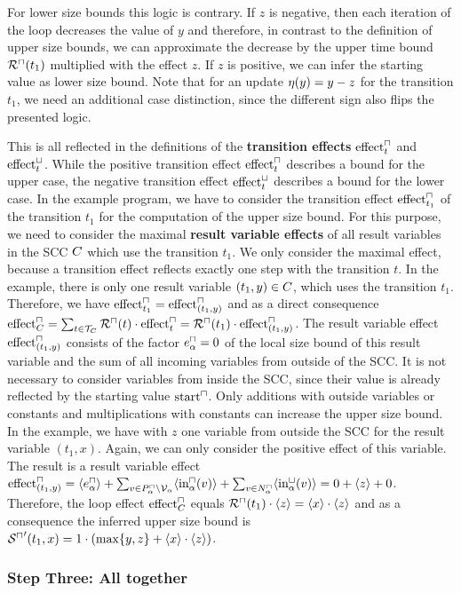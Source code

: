 For lower size bounds this logic is contrary.
If $z$ is negative, then each iteration of the loop decreases the value of $y$ and therefore, in contrast to the definition of upper size bounds, we can approximate the decrease by the upper time bound ${\mathcal{R}^\sqcap}(t_1)$ multiplied with the effect $z$.
If $z$ is positive, we can infer the starting value as lower size bound.
Note that for an update $\eta(y) = y - z$ for the transition $t_1$, we need an additional case distinction, since the different sign also flips the presented logic.

This is all reflected in the definitions of the \textbf{transition effects} $\text{effect}^\sqcap_t$ and $\text{effect}^\sqcup_t$.
While the positive transition effect $\text{effect}^\sqcap_t$ describes a bound for the upper case, the negative transition effect $\text{effect}^\sqcup_t$ describes a bound for the lower case.
In the example program, we have to consider the transition effect $\text{effect}^\sqcap_{t_1}$ of the transition $t_1$ for the computation of the upper size bound.
For this purpose, we need to consider the maximal \textbf{result variable effects} of all result variables in the SCC $C$ which use the transition $t_1$.
We only consider the maximal effect, because a transition effect reflects exactly one step with the transition $t$.
In the example, there is only one result variable $(t_1,y) \in C$, which uses the transition $t_1$.
Therefore, we have $\text{effect}^\sqcap_{t_1} = \text{effect}^\sqcap_{(t_1,y)}$ and as a direct consequence $\text{effect}^\sqcap_C = \sum_{t \in \mathcal{T}_C} {\mathcal{R}^\sqcap}(t) \cdot \text{effect}^\sqcap_{t} = {\mathcal{R}^\sqcap}(t_1) \cdot \text{effect}^\sqcap_{(t_1,y)}$.
The result variable effect $\text{effect}^\sqcap_{(t_1,y)}$ consists of the factor $e^\sqcap_\alpha = 0$ of the local size bound of this result variable and the sum of all incoming variables from outside of the SCC.
It is not necessary to consider variables from inside the SCC, since their value is already reflected by the starting value $\text{start}^\sqcap$.
Only additions with outside variables or constants and multiplications with constants can increase the upper size bound.
In the example, we have with $z$ one variable from outside the SCC for the result variable $(t_1,x)$.
Again, we can only consider the positive effect of this variable.
The result is a result variable effect $\text{effect}^\sqcap_{(t_1,y)} = \langle e^\sqcap_\alpha\rangle + \sum_{v \in P_\alpha^\sqcap \setminus \mathcal{V}_\alpha} \langle\text{in}^\sqcap_\alpha(v)\rangle + \sum_{v \in N_\alpha^\sqcap} \langle\text{in}^\sqcup_\alpha(v)\rangle = 0 + \langle z\rangle + 0$.
Therefore, the loop effect $\text{effect}^\sqcap_C$ equals ${\mathcal{R}^\sqcap}(t_1) \cdot \langle z\rangle = \langle x\rangle \cdot \langle z\rangle$ and as a consequence the inferred upper size bound is ${\mathcal{S}^\sqcap}'(t_1,x) = 1 \cdot (\max \lbrace y,z \rbrace + \langle x\rangle \cdot \langle z\rangle)$.

\subsubsection{Step Three: All together}

